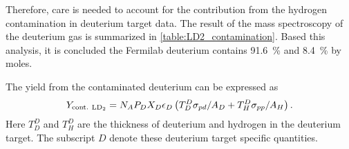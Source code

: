 \documentclass[../main.tex]{subfiles}
\begin{document}
Therefore, care is needed to account for the contribution from the hydrogen contamination in deuterium
target data. The result of the mass spectroscopy of the deuterium gas \cite{don-4993} is
summarized in \cref{table:LD2_contamination}. Based this analysis, it is concluded the Fermilab
deuterium contains \SI{91.6}{\percent}  and \SI{8.4}{\percent}  by moles. 

The yield from the contaminated deuterium can be expressed as
\begin{equation}
	Y_{\mathrm{cont.~\ce{LD_2}}} = N_A P_D X_D \epsilon_D \left( T_D^D \sigma_{pd}/A_D + T^D_H \sigma_{pp}/A_H   \right).
\end{equation}
Here $T_D^D$ and $T^D_H$ are the thickness of deuterium and hydrogen in the deuterium target.
The subscript $D$ denote these deuterium target specific quantities.
\end{document}
